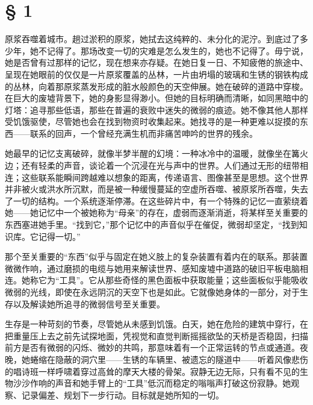 

\finishpart

\section{§ 1}

原浆吞噬着城市。趟过淤积的原浆，她拭去这纯粹的、未分化的泥泞。到底过了多少年，她不记得了。那场改变一切的灾难是怎么发生的，她也不记得了。毋宁说，她是否曾有过那样的记忆，现在想来亦存疑。在她日复一日、不知疲倦的旅途中、呈现在她眼前的仅仅是一片原浆覆盖的丛林，一片由坍塌的玻璃和生锈的钢铁构成的丛林，向着那原浆蒸发形成的脏水般颜色的天空伸展。她在破碎的道路中穿梭。在巨大的废墟背景下，她的身影显得渺小。但她的目标明确而清晰，如同黑暗中的灯塔：追寻那些低语，那些在普遍的衰败中迷失的微弱的痕迹。她不像其他人那样受饥饿驱使，尽管她也会在找到物资时收集起来。她找寻的是一种更难以捉摸的东西——联系的回声，一个曾经充满生机而非痛苦呻吟的世界的残余。

她最早的记忆支离破碎，就像半梦半醒的幻境：一种冰冷中的温暖，就像坐在篝火边；还有轻柔的声音，谈论着一个沉浸在光与声中的世界。人们通过无形的纽带相连；这些联系能瞬间跨越难以想象的距离，传递语言、图像甚至是思想。这个世界并非被火或洪水所沉默，而是被一种缓慢蔓延的空虚所吞噬、被原浆所吞噬，失去了一切的结构。一个系统逐渐停滞。在这些碎片中，有一个特殊的记忆一直萦绕着她——她记忆中一个被她称为“母亲”的存在，虚弱而逐渐消逝，将某样至关重要的东西塞进她手里。“找到它，”那个记忆中的声音似乎在催促，微弱却坚定，“找到知识库。它记得一切。”

那个至关重要的“东西”似乎与固定在她义肢上的复杂装置有着内在的联系。那装置微微作响，通过磨损的电缆与她用来解读世界、感知废墟中道路的破旧平板电脑相连。她称它为“工具”。它从那些奇怪的黑色面板中获取能量；这些面板似乎能吸收微弱的光线，即使在永远阴沉的天空下也是如此。它就像她身体的一部分，对于生存以及解读她所追寻的微弱信号至关重要。

生存是一种苛刻的节奏，尽管她从未感到饥饿。白天，她在危险的建筑中穿行，在把重量压上去之前先试探地面，凭视觉和直觉判断摇摇欲坠的天桥是否稳固，扫描前方是否有微弱的闪烁、微妙的共鸣，那意味着有一个正常运转的节点或通道。夜晚，她蜷缩在隐蔽的洞穴里——生锈的车辆里、被遗忘的隧道中——听着风像悲伤的唱诗班一样呼啸着穿过高耸的摩天大楼的骨架。寂静无边无际，只有看不见的生物沙沙作响的声音和她手臂上的“工具”低沉而稳定的嗡嗡声打破这份寂静。她观察、记录偏差、规划下一步行动。目标就是她所知的一切。

